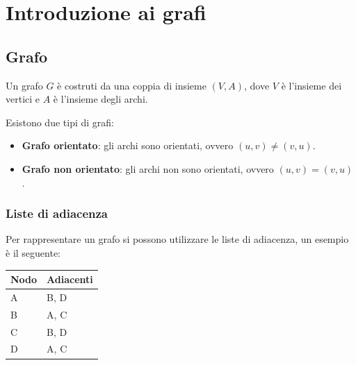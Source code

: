 
\chapter{Introduzione ai grafi}

\section{Grafo}

\begin{center}
\end{center}

Un grafo $G$ \`e costruti da una coppia di insieme $(V, A)$, dove $V$ \`e l'insieme dei vertici e $A$ \`e l'insieme degli archi.


Esistono due tipi di grafi:
\begin{itemize}
  \item \textbf{Grafo orientato}: gli archi sono orientati, ovvero $(u,v) \neq (v,u)$.
  \item \textbf{Grafo non orientato}: gli archi non sono orientati, ovvero $(u,v) = (v,u)$.
\end{itemize}



\subsection{Liste di adiacenza}
Per rappresentare un grafo si possono utilizzare le liste di adiacenza, un esempio \`e il seguente:

\begin{center}
\begin{tabular}{l|l}
Nodo & Adiacenti \\
\hline
A & B, D \\
B & A, C \\
C & B, D \\
D & A, C \\
\end{tabular}
\end{center}


